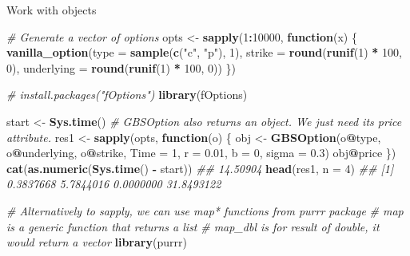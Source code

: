 \documentclass[
  10pt,
  ignorenonframetext,
  serif]{beamer}
\newenvironment{Shaded}{\begin{snugshade}}{\end{snugshade}}
\newcommand{\CommentTok}[1]{\textcolor[rgb]{0.56,0.35,0.01}{\textit{#1}}}
\newcommand{\ControlFlowTok}[1]{\textcolor[rgb]{0.13,0.29,0.53}{\textbf{#1}}}
\newcommand{\DataTypeTok}[1]{\textcolor[rgb]{0.13,0.29,0.53}{#1}}
\newcommand{\DecValTok}[1]{\textcolor[rgb]{0.00,0.00,0.81}{#1}}
\newcommand{\FloatTok}[1]{\textcolor[rgb]{0.00,0.00,0.81}{#1}}
\newcommand{\KeywordTok}[1]{\textcolor[rgb]{0.13,0.29,0.53}{\textbf{#1}}}
\newcommand{\NormalTok}[1]{#1}
\newcommand{\OperatorTok}[1]{\textcolor[rgb]{0.81,0.36,0.00}{\textbf{#1}}}
\newcommand{\StringTok}[1]{\textcolor[rgb]{0.31,0.60,0.02}{#1}}
\begin{document}
\begin{frame}[fragile]{Work with objects}
\protect\hypertarget{work-with-objects}{}
\begin{Shaded}
\begin{Highlighting}[]
\CommentTok{\# Generate a vector of options}
\NormalTok{opts \textless{}{-}}\StringTok{ }\KeywordTok{sapply}\NormalTok{(}\DecValTok{1}\OperatorTok{:}\DecValTok{10000}\NormalTok{, }\ControlFlowTok{function}\NormalTok{(x) \{ }
                          \KeywordTok{vanilla\_option}\NormalTok{(}\DataTypeTok{type =} \KeywordTok{sample}\NormalTok{(}\KeywordTok{c}\NormalTok{(}\StringTok{"c"}\NormalTok{, }\StringTok{"p"}\NormalTok{), }\DecValTok{1}\NormalTok{),}
                                         \DataTypeTok{strike =} \KeywordTok{round}\NormalTok{(}\KeywordTok{runif}\NormalTok{(}\DecValTok{1}\NormalTok{) }\OperatorTok{*}\StringTok{ }\DecValTok{100}\NormalTok{, }\DecValTok{0}\NormalTok{),}
                                         \DataTypeTok{underlying =} \KeywordTok{round}\NormalTok{(}\KeywordTok{runif}\NormalTok{(}\DecValTok{1}\NormalTok{) }\OperatorTok{*}\StringTok{ }\DecValTok{100}\NormalTok{, }\DecValTok{0}\NormalTok{)) \})}

\CommentTok{\# install.packages("fOptions")}
\KeywordTok{library}\NormalTok{(fOptions)}

\NormalTok{start \textless{}{-}}\StringTok{ }\KeywordTok{Sys.time}\NormalTok{()}
\CommentTok{\# GBSOption also returns an object. We just need its price attribute.}
\NormalTok{res1 \textless{}{-}}\StringTok{ }\KeywordTok{sapply}\NormalTok{(opts, }\ControlFlowTok{function}\NormalTok{(o) \{}
\NormalTok{  obj \textless{}{-}}\StringTok{ }\KeywordTok{GBSOption}\NormalTok{(o}\OperatorTok{@}\NormalTok{type, o}\OperatorTok{@}\NormalTok{underlying, o}\OperatorTok{@}\NormalTok{strike, }\DataTypeTok{Time =} \DecValTok{1}\NormalTok{,}
             \DataTypeTok{r =} \FloatTok{0.01}\NormalTok{, }\DataTypeTok{b =} \DecValTok{0}\NormalTok{, }\DataTypeTok{sigma =} \FloatTok{0.3}\NormalTok{)}
\NormalTok{  obj}\OperatorTok{@}\NormalTok{price}
\NormalTok{\})}
\KeywordTok{cat}\NormalTok{(}\KeywordTok{as.numeric}\NormalTok{(}\KeywordTok{Sys.time}\NormalTok{() }\OperatorTok{{-}}\StringTok{ }\NormalTok{start))}
\CommentTok{\#\# 14.50904}
\KeywordTok{head}\NormalTok{(res1, }\DataTypeTok{n =} \DecValTok{4}\NormalTok{)}
\CommentTok{\#\# [1]  0.3837668  5.7844016  0.0000000 31.8493122}

\CommentTok{\# Alternatively to sapply, we can use map* functions from purrr package}
\CommentTok{\# map is a generic function that returns a list}
\CommentTok{\# map\_dbl is for result of double, it would return a vector}
\KeywordTok{library}\NormalTok{(purrr)}


\end{Highlighting}
\end{Shaded}
\end{frame}
\end{document}
